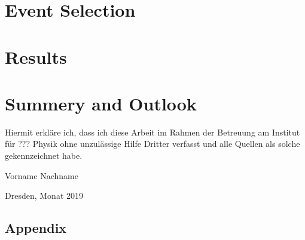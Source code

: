 \chapter{Event Selection}


\chapter{Results}


\chapter{Summery and Outlook}




\listoffigures
\listoftables

\clearpage
\thispagestyle{empty}
\vspace*{1.5em}

Hiermit erkläre ich, dass ich diese Arbeit im Rahmen der Betreuung am Institut
für ??? Physik ohne unzulässige Hilfe Dritter verfasst und alle Quellen als solche gekennzeichnet habe.

\vspace*{45em}

Vorname Nachname \par
Dresden, Monat 2019

\section{Appendix}
\label{sec:appendix}
